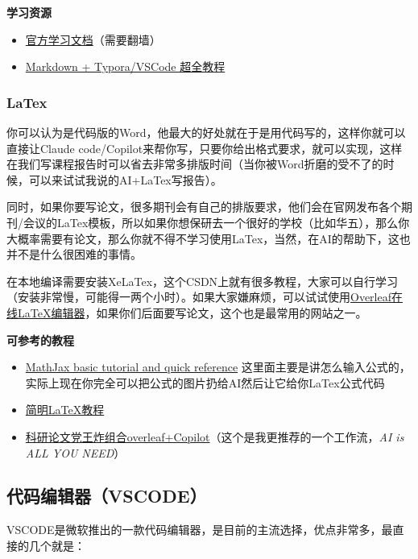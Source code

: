 \documentclass[a4paper,12pt]{article}
\begin{document}
\textbf{学习资源}

\begin{itemize}
    \item \href{https://markdown.com.cn/basic-syntax/}{官方学习文档}（需要翻墙）
    \item \href{https://www.bilibili.com/video/BV1hG411p7fX/}{Markdown + Typora/VSCode 超全教程}
\end{itemize}

\subsubsection{LaTex}

你可以认为是代码版的Word，他最大的好处就在于是用代码写的，这样你就可以直接让Claude code/Copilot来帮你写，只要你给出格式要求，就可以实现，这样在我们写课程报告时可以省去非常多排版时间（当你被Word折磨的受不了的时候，可以来试试我说的AI+LaTex写报告）。

同时，如果你要写论文，很多期刊会有自己的排版要求，他们会在官网发布各个期刊/会议的LaTex模板，所以如果你想保研去一个很好的学校（比如华五），那么你大概率需要有论文，那么你就不得不学习使用LaTex，当然，在AI的帮助下，这也并不是什么很困难的事情。

在本地编译需要安装XeLaTex，这个CSDN上就有很多教程，大家可以自行学习（安装非常慢，可能得一两个小时）。如果大家嫌麻烦，可以试试使用\href{https://cn.overleaf.com/project}{Overleaf在线LaTeX编辑器}，如果你们后面要写论文，这个也是最常用的网站之一。

\textbf{可参考的教程}

\begin{itemize}
    \item \href{https://math.meta.stackexchange.com/questions/5020/mathjax-basic-tutorial-and-quick-reference}{MathJax basic tutorial and quick reference} 这里面主要是讲怎么输入公式的，实际上现在你完全可以把公式的图片扔给AI然后让它给你LaTex公式代码
    \item \href{https://www.bilibili.com/video/BV1ihYKeQEKH/}{简明LaTeX教程}
    \item \href{https://www.bilibili.com/video/BV1RQALePEuu/}{科研论文党王炸组合overleaf+Copilot}（这个是我更推荐的一个工作流，\textit{AI is ALL YOU NEED}）
\end{itemize}

\subsection{代码编辑器（VSCODE）}

VSCODE是微软推出的一款代码编辑器，是目前的主流选择，优点非常多，最直接的几个就是：
\end{document}
